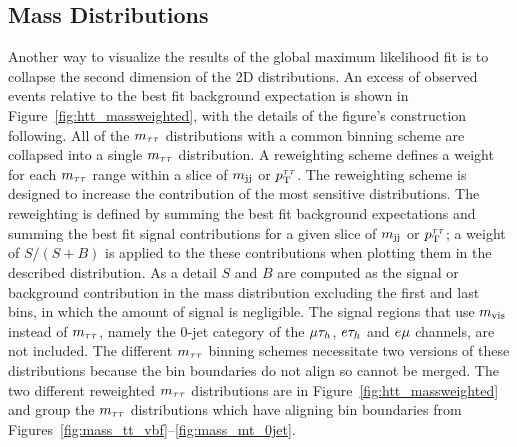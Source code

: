 \subsection{Mass Distributions}
Another way to visualize the results of the global maximum likelihood fit
is to collapse the second dimension of the 2D distributions. An excess of observed events relative 
to the best fit background expectation is shown in Figure~\ref{fig:htt_massweighted},
with the details of the figure's construction following.
All of the $m_{\tau\tau}$ distributions with a common binning scheme are collapsed into a single $m_{\tau\tau}$ distribution.
A reweighting scheme defines a weight for each $m_{\tau\tau}$ range within a slice of $m_\mathrm{jj}$ or $p_\mathrm{T}^{\tau\tau}$. The reweighting
scheme is designed to increase the contribution of the most sensitive distributions. The reweighting is defined
by summing the best fit background expectations and summing the best fit signal contributions for a given slice
of $m_\mathrm{jj}$ or $p_\mathrm{T}^{\tau\tau}$; a weight of $S/(S+B)$ is applied to the these contributions when plotting them in the described
distribution. As a detail $S$ and $B$ are computed as the signal or background contribution in the mass distribution 
excluding the first and last bins, in which the amount of signal is negligible. 
The signal regions that use $m_\text{vis}$ instead 
of $m_{\tau\tau}$, namely the 0-jet category of the $\mu\tau_{h}$, $e\tau_{h}$ and $e\mu$ channels, are not included. 
The different $m_{\tau\tau}$ binning schemes necessitate two versions of these distributions because the bin boundaries
do not align so cannot be merged.
The two different reweighted $m_{\tau\tau}$ distributions are in Figure~\ref{fig:htt_massweighted} and group the 
$m_{\tau\tau}$ distributions which have aligning bin boundaries from Figures~\ref{fig:mass_tt_vbf}--\ref{fig:mass_mt_0jet}.

